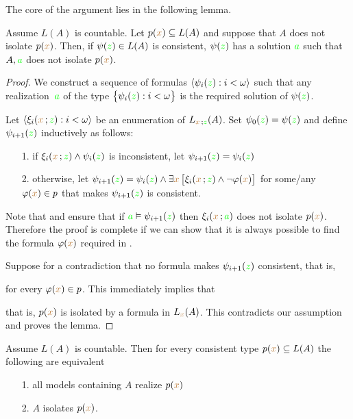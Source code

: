The core of the argument lies in the following lemma. 

\begin{lemma}\label{lem_kuratowskiUlam}
Assume $L(A)$ is countable.
Let $p({\color{brown} x})\subseteq L(A)$ and suppose that $A$ does not isolate $p({\color{brown} x})$.
Then, if $\psi({\color{green} z})\in L(A)$ is consistent, $\psi({\color{green} z})$ has a solution ${\color{green} a}$ such that $A,{\color{green} a}$ does not isolate $p({\color{brown} x})$.
\end{lemma}
\begin{proof}
We construct a sequence of formulas $\langle\psi_i({\color{green} z}):i<\omega\rangle$ such that any realization~${\color{green} a}$ of the type $\big\{\psi_i({\color{green} z}):i<\omega\big\}$ is the required solution of $\psi({\color{green} z})$.

Let $\langle\xi_i({\color{brown} x}\,;{\color{green} z}):i<\omega\rangle$ be an enumeration of $L_{{\color{brown} x}\,;{\color{green} z}}(A)$.
Set $\psi_0({\color{green} z})= \psi({\color{green} z})$ and define $\psi_{i+1}({\color{green} z})$ inductively as follows:
\begin{itemize}
   \item[1.] if $\xi_i({\color{brown} x}\,;{\color{green} z})\wedge\psi_i({\color{green} z})$ is inconsistent, let $\psi_{i+1}({\color{green} z})=\psi_i({\color{green} z})$
   \item[2.] otherwise, let $\displaystyle\psi_{i+1}({\color{green} z})=\psi_i({\color{green} z}) \wedge \exists{\color{brown}x}\,\big[\xi_i({\color{brown} x}\,;{\color{green} z})\wedge\neg\varphi({\color{brown} x})\big]$ for some/any $\varphi({\color{brown} x})\in p$ that makes $\psi_{i+1}({\color{green} z})$ is consistent.
\end{itemize}
Note that  and  ensure that if ${\color{green} a}\vDash\psi_{i+1}({\color{green} z})$ then $\xi_i({\color{brown} x}\,;{\color{green} a})$ does not isolate $p({\color{brown} x})$.
Therefore the proof is complete if we can show that it is always possible to find the formula $\varphi({\color{brown} x})$ required in .

Suppose for a contradiction that no formula makes $\psi_{i+1}({\color{green} z})$ consistent, that is, 


for every $\varphi({\color{brown} x})\in p$.
This immediately implies that 


that is, $p({\color{brown} x})$ is isolated by a formula in $L_{{\color{brown} x}}(A)$.
This contradicts our assumption and proves the lemma.
\end{proof}

\begin{void} Assume $L(A)$ is countable.
Then for every consistent type $p({\color{brown} x})\subseteq L(A)$ the following are equivalent
\begin{itemize}   
\item[1.] all models containing $A$ realize $p({\color{brown} x})$
\item[2.] $A$ isolates $p({\color{brown} x})$.
\end{itemize}
\end{void}

